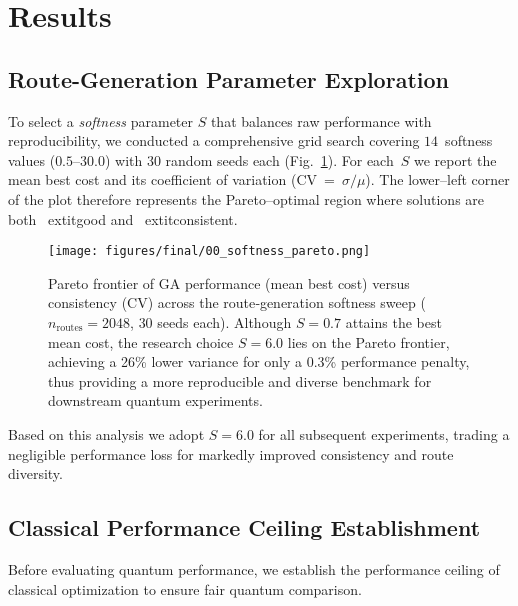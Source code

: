 \section{Results}
\label{sec:results}

\subsection{Route-Generation Parameter Exploration}

To select a \emph{softness} parameter $S$ that balances raw performance with
reproducibility, we conducted a comprehensive grid search covering
$14$~softness values ($0.5$--$30.0$) with $30$ random seeds each
(Fig.~\ref{fig:softness_pareto}).  For each~$S$ we report the mean best cost
and its coefficient of variation (CV~=~$\sigma/\mu$).  The lower--left
corner of the plot therefore represents the Pareto--optimal region where
solutions are both \	extit{good} and \	extit{consistent}.

\begin{figure}[htb]
    \centering
    \texttt{[image: figures/final/00\_softness\_pareto.png]}
    \caption{Pareto frontier of GA performance (mean best cost) versus consistency
    (CV) across the route‐generation softness sweep ($n_{\text{routes}}=2048$,
    $30$ seeds each).  Although $S=0.7$ attains the best mean cost, the
    research choice $S=6.0$ lies on the Pareto frontier, achieving a 26\%
    lower variance for only a 0.3\% performance penalty, thus providing a more
    reproducible and diverse benchmark for downstream quantum experiments.}
    \label{fig:softness_pareto}
\end{figure}

Based on this analysis we adopt $S=6.0$ for all subsequent experiments,
trading a negligible performance loss for markedly improved consistency and
route diversity.

\subsection{Classical Performance Ceiling Establishment}

Before evaluating quantum performance, we establish the performance ceiling of classical optimization to ensure fair quantum comparison.


